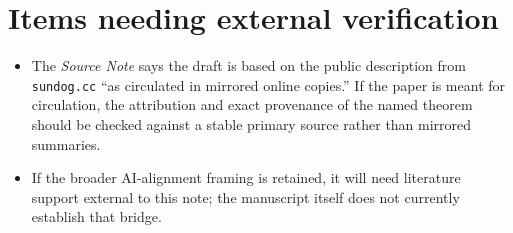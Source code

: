 \documentclass[11pt]{article}
\begin{document}
\section*{Items needing external verification}

\begin{itemize}
    \item The \emph{Source Note} says the draft is based on the public description from \texttt{sundog.cc} ``as circulated in mirrored online copies.'' If the paper is meant for circulation, the attribution and exact provenance of the named theorem should be checked against a stable primary source rather than mirrored summaries.
    \item If the broader AI-alignment framing is retained, it will need literature support external to this note; the manuscript itself does not currently establish that bridge.
\end{itemize}
\end{document}
